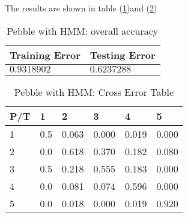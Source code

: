 \begin{itemize}
The results are shown in table (\ref{tab:pebbleHMM1})and (\ref{tab:pebbleHMM2})
\begin{table}
\begin{center}
\begin{tabular}{|l|l|}
      \hline
      Training Error & Testing Error\\
      \hline
      $0.9318902$ & $ 0.6237288$ \\
      \hline
\end{tabular}
\caption{Pebble with HMM: overall accuracy}
\label{tab:pebbleHMM1}
\end{center}
\end{table}
\begin{table}
\begin{center}
\begin{tabular}{|l|l|l|l|l|l|}
      \hline
      P/T& 1 & 2 &3 & 4 & 5 \\
      \hline
      1 &0.5&0.063&0.000&0.019&0.000\\
      2 &0.0&0.618&0.370&0.182&0.080\\
      3 &0.5&0.218&0.555&0.183&0.000\\
      4 &0.0&0.081&0.074&0.596&0.000\\
      5 &0.0&0.018&0.000&0.019&0.920\\
      \hline
\end{tabular}
\caption{Pebble with HMM: Cross Error Table}
\label{tab:pebbleHMM2}
\end{center}
\end{table}

\end{itemize}

